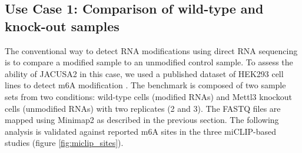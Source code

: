 \documentclass[times, 11pt, a4paper]{article}
\begin{document}
\begin{enumerate}
\end{enumerate}	
\subsection*{Use Case 1: Comparison of wild-type and knock-out samples}
The conventional way to detect RNA modifications using direct RNA sequencing is to compare a modified sample to an unmodified control sample. To assess the ability of JACUSA2 in this case, we used a published dataset of HEK293 cell lines to detect m6A modification \citep{pratanwanich2021identification}. The benchmark is composed of two sample sets from two conditions: wild-type cells (modified RNAs) and Mettl3 knockout cells (unmodified RNAs) with two replicates (2 and 3). The FASTQ files are mapped using Minimap2 as described in the previous section. The following analysis is validated against reported m6A sites in the three miCLIP-based studies \cite{boulias2019identification,koh2019atlas,kortel2021deep} (figure \ref{fig:miclip_sites}). 
\end{document}
